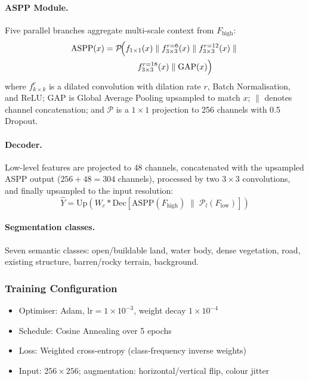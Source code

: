 \documentclass[twocolumn]{article}
\begin{document}
\paragraph{ASPP Module.}
Five parallel branches aggregate multi-scale context from $F_\mathrm{high}$:
\begin{align}
  \mathrm{ASPP}(x) &= \mathcal{P}\!\Bigl(
    f_{1\times1}(x)\;\|\;
    f_{3\times3}^{r=6}(x)\;\|\;
    f_{3\times3}^{r=12}(x)\;\|\; \nonumber\\
  &\qquad\qquad f_{3\times3}^{r=18}(x)\;\|\;
    \mathrm{GAP}(x)
  \Bigr)
  \label{eq:aspp}
\end{align}
where $f_{k\times k}^{r}$ is a dilated convolution with dilation rate $r$, Batch Normalisation,
and ReLU; $\mathrm{GAP}$ is Global Average Pooling upsampled to match $x$; $\|$ denotes channel
concatenation; and $\mathcal{P}$ is a $1\times1$ projection to 256 channels with 0.5 Dropout.

\paragraph{Decoder.}
Low-level features are projected to 48 channels, concatenated with the upsampled ASPP output
($256+48=304$ channels), processed by two $3\times3$ convolutions, and finally upsampled to the
input resolution:
\begin{equation}
  \hat{Y} = \mathrm{Up}\!\left(
    W_c \ast \mathrm{Dec}\!\left[
      \mathrm{ASPP}(F_\mathrm{high})\;\|\;
      \mathcal{P}_l(F_\mathrm{low})
    \right]
  \right)
  \label{eq:decoder}
\end{equation}

\paragraph{Segmentation classes.}
Seven semantic classes: open/buildable land, water body, dense vegetation, road, existing
structure, barren/rocky terrain, background.

\subsubsection{Training Configuration}

\begin{itemize}[leftmargin=*,nosep,topsep=2pt]
  \item Optimiser: Adam, $\mathrm{lr}{=}1\!\times\!10^{-3}$,
        weight decay $1\!\times\!10^{-4}$
  \item Schedule: Cosine Annealing over 5 epochs
  \item Loss: Weighted cross-entropy (class-frequency inverse weights)
  \item Input: $256\times256$; augmentation: horizontal/vertical flip, colour jitter
\end{itemize}
\end{document}
